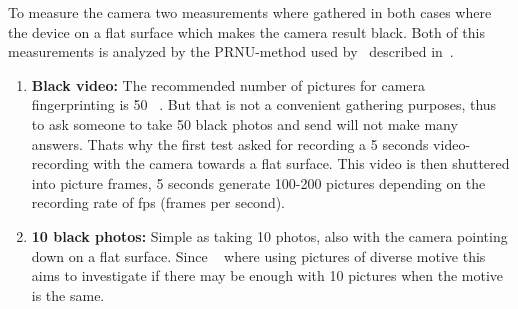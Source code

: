 To measure the camera two measurements where gathered in both cases where the device on a flat surface which makes the camera result black. Both of this measurements is analyzed by the PRNU-method used by~\cite{sensor:camera:DCIdent} described in~.
\begin{enumerate}
  \item \textbf{Black video:} The recommended number of pictures for camera fingerprinting is 50 ~\cite[]{sensor:camera:DCIdent}. But that is not a convenient gathering purposes, thus to ask someone to take 50 black photos and send will not make many answers. Thats why the first test asked for recording a 5 seconds video-recording with the camera towards a flat surface. This video is then shuttered into picture frames, 5 seconds generate 100-200 pictures depending on the recording rate of fps (frames per second).
  \item \textbf{10 black photos:} Simple as taking 10 photos, also with the camera pointing down on a flat surface. Since ~\cite{sensor:camera:DCIdent} where using pictures of diverse motive this aims to investigate if there may be enough with 10 pictures when the motive is the same.
\end{enumerate}

